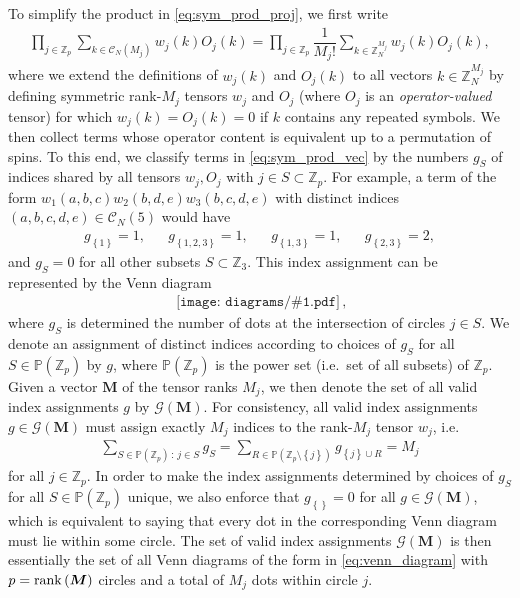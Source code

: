 \documentclass[nofootinbib,notitlepage,11pt]{revtex4-2}
\newcommand{\f}[2]{\dfrac{#1}{#2}} %
\newcommand{\p}[1]{\left(#1\right)} %
\renewcommand{\set}[1]{\left\{#1\right\}} %
\newcommand{\m}{\bm} %
\newcommand{\1}{\mathds{1}}
\newcommand{\C}{\mathcal{C}}
\newcommand{\G}{\mathcal{G}}
\newcommand{\PP}{\mathbb{P}}
\newcommand{\ZZ}{\mathbb{Z}}
\newcommand{\diagram}[1]
{\,\texttt{[image: diagrams/\#1.pdf]}\,}
\begin{document}
To simplify the product in \eqref{eq:sym_prod_proj}, we first write
\begin{align}
  \prod_{j\in\ZZ_p} \sum_{k\in\C_N\p{M_j}} w_j\p{k} O_j\p{k}
  = \prod_{j\in\ZZ_p} \f1{M_j!} \sum_{k\in\ZZ_N^{M_j}}
  w_j\p{k} O_j\p{k},
  \label{eq:sym_prod_vec}
\end{align}
where we extend the definitions of $w_j\p{k}$ and $O_j\p{k}$ to all
vectors $k\in\ZZ_N^{M_j}$ by defining symmetric rank-$M_j$ tensors
$w_j$ and $O_j$ (where $O_j$ is an {\it operator-valued} tensor) for
which $w_j\p{k}=O_j\p{k}=0$ if $k$ contains any repeated symbols.  We
then collect terms whose operator content is equivalent up to a
permutation of spins.  To this end, we classify terms in
\eqref{eq:sym_prod_vec} by the numbers $g_S$ of indices shared by all
tensors $w_j,O_j$ with $j\in S\subset\ZZ_p$.  For example, a term of
the form $w_1\p{a,b,c} w_2\p{b,d,e} w_3\p{b,c,d,e}$ with distinct
indices $\p{a,b,c,d,e}\in\C_N\p{5}$ would have
\begin{align}
  g_{\set{1}} = 1,
  &&
  g_{\set{1,2,3}} = 1,
  &&
  g_{\set{1,3}} = 1,
  &&
  g_{\set{2,3}} = 2,
\end{align}
and $g_S=0$ for all other subsets $S\subset\ZZ_3$.  This index
assignment can be represented by the Venn diagram
\begin{align}
  \diagram{example},
  \label{eq:venn_diagram}
\end{align}
where $g_S$ is determined the number of dots at the intersection of
circles $j\in S$.  We denote an assignment of distinct indices
according to choices of $g_S$ for all $S\in\PP\p{\ZZ_p}$ by $g$, where
$\PP\p{\ZZ_p}$ is the power set (i.e.~set of all subsets) of $\ZZ_p$.
Given a vector $\m M$ of the tensor ranks $M_j$, we then denote the
set of all valid index assignments $g$ by $\G\p{\m M}$.  For
consistency, all valid index assignments $g\in\G\p{\m M}$ must assign
exactly $M_j$ indices to the rank-$M_j$ tensor $w_j$, i.e.~
\begin{align}
  \sum_{S\in\PP\p{\ZZ_p}\,:\,j\in S} g_S
  = \sum_{R\in\PP\p{\ZZ_p\setminus\set{j}}} g_{\set{j}\cup R}
  = M_j
\end{align}
for all $j\in\ZZ_p$.  In order to make the index assignments
determined by choices of $g_S$ for all $S\in\PP\p{\ZZ_p}$ unique, we
also enforce that $g_{\set{}}=0$ for all $g\in\G\p{\m M}$, which is
equivalent to saying that every dot in the corresponding Venn diagram
must lie within some circle.  The set of valid index assignments
$\G\p{\m M}$ is then essentially the set of all Venn diagrams of the
form in \eqref{eq:venn_diagram} with $p=\rank\p{\m M}$ circles and a
total of $M_j$ dots within circle $j$.
\end{document}
